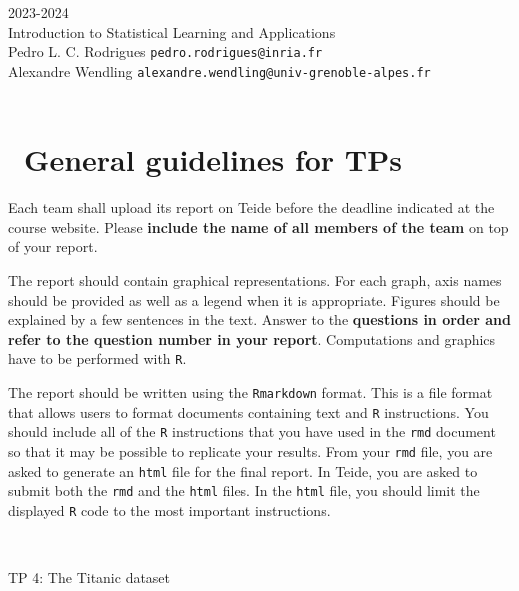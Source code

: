 \begin{flushleft}
 \hfill {} 2023-2024 \\
Introduction to Statistical Learning and Applications \\
Pedro L. C. Rodrigues   \hfill  \texttt{pedro.rodrigues@inria.fr} \\
Alexandre Wendling \hfill \texttt{alexandre.wendling@univ-grenoble-alpes.fr} \\

\HRuleTop\\

\section*{\faExclamationTriangle~General guidelines for TPs}

Each team shall upload its report on Teide before the deadline indicated at the course website. Please \textbf{include the name of all members of the team} on top of your report. 

The report should contain graphical representations. For each graph, axis names should be provided as well as a legend when it is appropriate. Figures should be explained by a few sentences in the text. Answer to the \textbf{questions in order and refer to the question number in your report}. Computations and graphics have to be performed with \texttt{R}.

The report should be written using the \texttt{Rmarkdown} format. This is a file format that allows users to format documents containing text and \texttt{R} instructions. You should include all of the \texttt{R} instructions that you have used in the \texttt{rmd} document so that it may be possible to replicate your results. From your \texttt{rmd} file, you are asked to generate an \texttt{html} file for the final report. In Teide, you are asked to submit both the \texttt{rmd} and the \texttt{html} files. In the \texttt{html} file, you should limit the displayed \texttt{R} code to the most important instructions.

\HRuleTop\\
\begin{center}
\Large{TP 4: The Titanic dataset}
\end{center}
\HRuleBottom
\end{flushleft}
